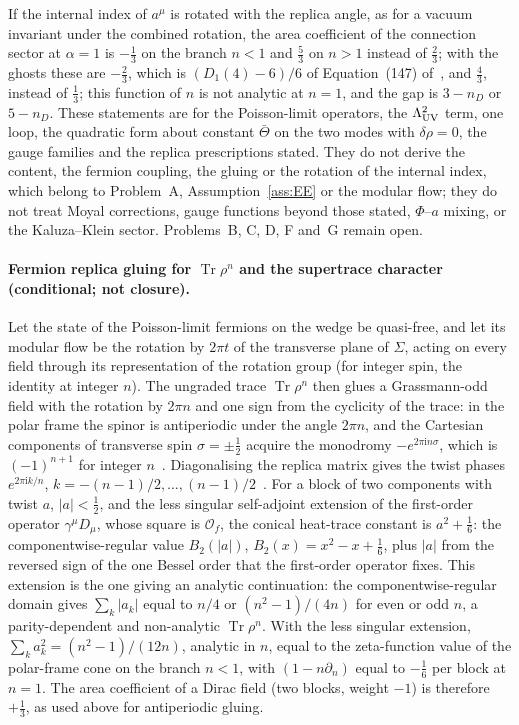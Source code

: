 If the internal index of \(a^\mu\) is rotated with the replica angle, as for a vacuum invariant under the combined rotation, the area coefficient of the connection sector at \(\alpha=1\) is \(-\tfrac13\) on the branch \(n<1\) and \(\tfrac53\) on \(n>1\) instead of \(\tfrac23\); with the ghosts these are \(-\tfrac23\), which is \((D_1(4)-6)/6\) of Equation~(147) of~\cite{Solodukhin2011}, and \(\tfrac43\), instead of \(\tfrac13\); this function of \(n\) is not analytic at \(n=1\), and the gap is \(3-n_D\) or \(5-n_D\). These statements are for the Poisson-limit operators, the \(\Lambda_{\mathrm{UV}}^2\) term, one loop, the quadratic form about constant \(\bar\Theta\) on the two modes with \(\delta\rho=0\), the gauge families and the replica prescriptions stated. They do not derive the content, the fermion coupling, the gluing or the rotation of the internal index, which belong to Problem~A, Assumption~\ref{ass:EE} or the modular flow; they do not treat Moyal corrections, gauge functions beyond those stated, \(\Phi\)--\(a\) mixing, or the Kaluza--Klein sector. Problems~B, C, D, F and~G remain open.

\paragraph{Fermion replica gluing for \(\operatorname{Tr}\rho^n\) and the supertrace character (conditional; not closure).}
Let the state of the Poisson-limit fermions on the wedge be quasi-free, and let its modular flow be the rotation by \(2\pi t\) of the transverse plane of \(\Sigma\), acting on every field through its representation of the rotation group (for integer spin, the identity at integer \(n\)). The ungraded trace \(\operatorname{Tr}\rho^n\) then glues a Grassmann-odd field with the rotation by \(2\pi n\) and one sign from the cyclicity of the trace: in the polar frame the spinor is antiperiodic under the angle \(2\pi n\), and the Cartesian components of transverse spin \(\sigma=\pm\tfrac12\) acquire the monodromy \(-e^{2\pi\mathrm in\sigma}\), which is \((-1)^{n+1}\) for integer \(n\)~\cite{CasiniHuerta2009,FursaevMiele1997}. Diagonalising the replica matrix gives the twist phases \(e^{2\pi\mathrm ik/n}\), \(k=-(n-1)/2,\dots,(n-1)/2\)~\cite{CasiniHuerta2009}. For a block of two components with twist \(a\), \(|a|<\tfrac12\), and the less singular self-adjoint extension of the first-order operator \(\gamma^\mu D_\mu\), whose square is \(\mathcal O_f\), the conical heat-trace constant is \(a^2+\tfrac16\): the componentwise-regular value \(B_2(|a|)\), \(B_2(x)=x^2-x+\tfrac16\), plus \(|a|\) from the reversed sign of the one Bessel order that the first-order operator fixes. This extension is the one giving an analytic continuation: the componentwise-regular domain gives \(\sum_k|a_k|\) equal to \(n/4\) or \((n^2-1)/(4n)\) for even or odd \(n\), a parity-dependent and non-analytic \(\operatorname{Tr}\rho^n\). With the less singular extension, \(\sum_ka_k^2=(n^2-1)/(12n)\), analytic in \(n\), equal to the zeta-function value of the polar-frame cone on the branch \(n<1\), with \((1-n\partial_n)\) equal to \(-\tfrac16\) per block at \(n=1\). The area coefficient of a Dirac field (two blocks, weight \(-1\)) is therefore \(+\tfrac13\), as used above for antiperiodic gluing.

